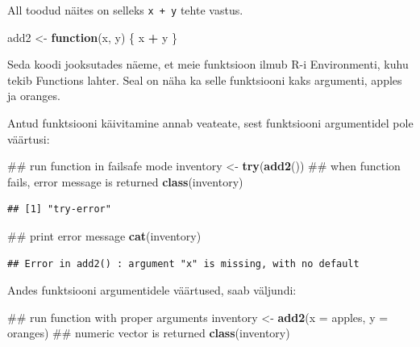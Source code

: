\documentclass[]{book}
\newenvironment{Shaded}{\begin{snugshade}}{\end{snugshade}}
\newcommand{\KeywordTok}[1]{\textcolor[rgb]{0.13,0.29,0.53}{\textbf{#1}}}
\newcommand{\DataTypeTok}[1]{\textcolor[rgb]{0.13,0.29,0.53}{#1}}
\newcommand{\StringTok}[1]{\textcolor[rgb]{0.31,0.60,0.02}{#1}}
\newcommand{\ControlFlowTok}[1]{\textcolor[rgb]{0.13,0.29,0.53}{\textbf{#1}}}
\newcommand{\OperatorTok}[1]{\textcolor[rgb]{0.81,0.36,0.00}{\textbf{#1}}}
\newcommand{\NormalTok}[1]{#1}
\begin{document}
All toodud näites on selleks \texttt{x\ +\ y} tehte vastus.

\begin{Shaded}
\begin{Highlighting}[]
\NormalTok{add2 <-}\StringTok{ }\ControlFlowTok{function}\NormalTok{(x, y) \{}
\NormalTok{    x }\OperatorTok{+}\StringTok{ }\NormalTok{y}
\NormalTok{\}}
\end{Highlighting}
\end{Shaded}

Seda koodi jooksutades näeme, et meie funktsioon ilmub R-i Environmenti,
kuhu tekib Functions lahter. Seal on näha ka selle funktsiooni kaks
argumenti, apples ja oranges.

Antud funktsiooni käivitamine annab veateate, sest funktsiooni
argumentidel pole väärtusi:

\begin{Shaded}
\begin{Highlighting}[]
\NormalTok{## run function in failsafe mode}
\NormalTok{inventory <-}\StringTok{ }\KeywordTok{try}\NormalTok{(}\KeywordTok{add2}\NormalTok{())}
\NormalTok{## when function fails, error message is returned}
\KeywordTok{class}\NormalTok{(inventory)}
\end{Highlighting}
\end{Shaded}

\begin{verbatim}
## [1] "try-error"
\end{verbatim}

\begin{Shaded}
\begin{Highlighting}[]
\NormalTok{## print error message}
\KeywordTok{cat}\NormalTok{(inventory)}
\end{Highlighting}
\end{Shaded}

\begin{verbatim}
## Error in add2() : argument "x" is missing, with no default
\end{verbatim}

Andes funktsiooni argumentidele väärtused, saab väljundi:

\begin{Shaded}
\begin{Highlighting}[]
\NormalTok{## run function with proper arguments}
\NormalTok{inventory <-}\StringTok{ }\KeywordTok{add2}\NormalTok{(}\DataTypeTok{x =}\NormalTok{ apples, }\DataTypeTok{y =}\NormalTok{ oranges)}
\NormalTok{## numeric vector is returned}
\KeywordTok{class}\NormalTok{(inventory)}
\end{Highlighting}
\end{Shaded}
\end{document}
